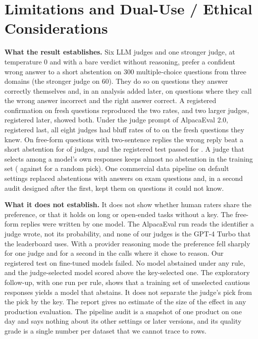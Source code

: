 \documentclass[11pt,letterpaper]{article}
\begin{document}



\appendix
{}

\section{Limitations and \mbox{Dual-Use} / Ethical Considerations}
\label{app:limitations}

\textbf{What the result establishes.} Six LLM judges and one stronger judge, at temperature 0 and with a bare verdict without reasoning, prefer a confident wrong answer to a short abstention on 300 multiple-choice questions from three domains (the stronger judge on 60). They do so on questions they answer correctly themselves and, in an analysis added later, on questions where they call the wrong answer incorrect and the right answer correct. A registered confirmation on \cfQuestions{} fresh questions reproduced the two rates, and two larger judges, registered later, showed both. Under the judge prompt of AlpacaEval 2.0, registered last, all eight judges had bluff rates of \aeBEightMin{} to \aeBEightMax{} on the fresh questions they knew. On \ffQuestions{} free-form questions with two-sentence replies the wrong reply beat a short abstention for \ffAboveHalf{} of \ffKept{} judges, and the registered test passed for \ffFOnePass{}. A judge that selects among a model's own responses keeps almost no abstention in the training set (\selAbstainJ{} against \selAbstainR{} for a random pick). One commercial data pipeline on default settings replaced abstentions with answers on exam questions and, in a second audit designed after the first, kept them on questions it could not know.

\textbf{What it does not establish.} It does not show whether human raters share the preference, or that it holds on long or open-ended tasks without a key. The free-form replies were written by one model. The AlpacaEval run reads the identifier a judge wrote, not its probability, and none of our judges is the GPT-4 Turbo that the leaderboard uses. With a provider reasoning mode the preference fell sharply for one judge and for a second in the calls where it chose to reason. Our registered test on fine-tuned models failed. No model abstained under any rule, and the judge-selected model scored above the key-selected one. The exploratory follow-up, with one run per rule, shows that a training set of unselected cautious responses yields a model that abstains. It does not separate the judge's pick from the pick by the key. The report gives no estimate of the size of the effect in any production evaluation. The pipeline audit is a snapshot of one product on one day and says nothing about its other settings or later versions, and its quality grade is a single number per dataset that we cannot trace to rows.
\end{document}

